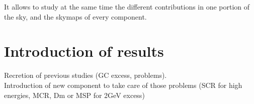 It allows to study at the same time the different contributions in one portion of the sky, and the skymaps of every component.\\



\section{Introduction of results}

Recretion of previous studies (GC excess, problems).\\
Introduction of new component to take care of those problems (SCR for high energies, MCR, Dm or MSP for 2GeV excess)


